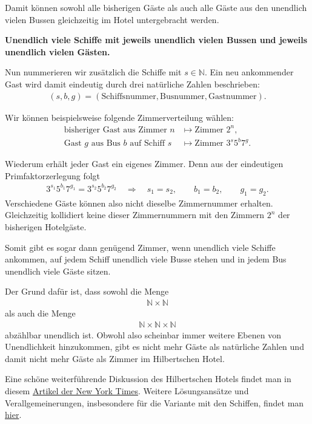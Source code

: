 \documentclass[a4paper,10pt]{article}
\newcommand{\N}{\mathbb{N}}
\begin{document}
{Damit können sowohl alle bisherigen Gäste als auch alle Gäste aus den unendlich vielen Bussen gleichzeitig im Hotel untergebracht werden.


\textbf{Unendlich viele Schiffe mit jeweils unendlich vielen Bussen und jeweils unendlich vielen Gästen.}

Nun nummerieren wir zusätzlich die Schiffe mit $s\in\N$. Ein neu ankommender Gast wird damit eindeutig durch drei natürliche Zahlen beschrieben:
\begin{align*}
    (s,b,g)
    =
    (\text{Schiffsnummer},\text{Busnummer},\text{Gastnummer}).
\end{align*}

Wir können beispielsweise folgende Zimmerverteilung wählen:
\begin{align*}
    \text{bisheriger Gast aus Zimmer }n
    &\longmapsto \text{Zimmer }2^n,\\
    \text{Gast }g\text{ aus Bus }b\text{ auf Schiff }s
    &\longmapsto \text{Zimmer }3^s5^b7^g.
\end{align*}

Wiederum erhält jeder Gast ein eigenes Zimmer. Denn aus der eindeutigen Primfaktorzerlegung folgt
\begin{align*}
    3^{s_1}5^{b_1}7^{g_1}
    =
    3^{s_2}5^{b_2}7^{g_2}
    \quad\Longrightarrow\quad
    s_1=s_2,\qquad b_1=b_2,\qquad g_1=g_2.
\end{align*}
Verschiedene Gäste können also nicht dieselbe Zimmernummer erhalten. Gleichzeitig kollidiert keine dieser Zimmernummern mit den Zimmern $2^n$ der bisherigen Hotelgäste.

Somit gibt es sogar dann genügend Zimmer, wenn unendlich viele Schiffe ankommen, auf jedem Schiff unendlich viele Busse stehen und in jedem Bus unendlich viele Gäste sitzen.

Der Grund dafür ist, dass sowohl die Menge
\begin{align*}
    \N\times\N
\end{align*}
als auch die Menge
\begin{align*}
    \N\times\N\times\N
\end{align*}
abzählbar unendlich ist. Obwohl also scheinbar immer weitere Ebenen von Unendlichkeit hinzukommen, gibt es nicht mehr Gäste als natürliche Zahlen und damit nicht mehr Gäste als Zimmer im Hilbertschen Hotel.

\medskip

Eine schöne weiterführende Diskussion des Hilbertschen Hotels findet man in diesem
\href{https://archive.nytimes.com/opinionator.blogs.nytimes.com/2010/05/09/the-hilbert-hotel/}{Artikel der New York Times}.
Weitere Lösungsansätze und Verallgemeinerungen, insbesondere für die Variante mit den Schiffen, findet man
\href{https://bit.ly/hilbertvorkurs}{hier}.
}
\end{document}
